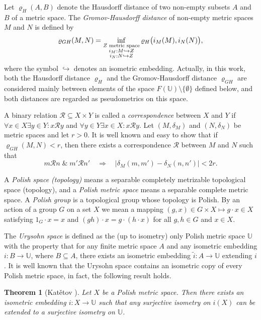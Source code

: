 \documentclass[a4paper]{amsart}
\theoremstyle{plain}
\newtheorem{theorem}{Theorem}[section]
\theoremstyle{remark}
\begin{document}
Let $ \varrho_{H}(A, B) $ denote the Hausdorff distance of two non-empty subsets $ A $ and $ B $ of a metric space. The \emph{Gromov-Hausdorff distance} of non-empty metric spaces $ M $ and $ N $ is defined by
$$ \varrho_{GH} (M, N) = \inf_{\substack{\textnormal{$ Z $ metric space}\\ i_{M} : M \hookrightarrow Z\\ i_{N}: N \hookrightarrow Z}} \varrho_{H} \big( i_{M}(M), i_{N}(N) \big), $$
where the symbol $ \hookrightarrow $ denotes an isometric embedding. Actually, in this work, both the Hausdorff distance $ \varrho_{H} $ and the Gromov-Hausdorff distance $ \varrho_{GH} $ are considered mainly between elements of the space $ F(\mathbb{U}) \setminus \{ \emptyset \} $ defined below, and both distances are regarded as pseudometrics on this space.

A binary relation $ \mathcal{R} \subseteq X \times Y $ is called a \emph{correspondence} between $ X $ and $ Y $ if $ \forall x \in X \exists y \in Y : x \mathcal{R} y $ and $ \forall y \in Y \exists x \in X : x \mathcal{R} y $. Let $ (M, \delta_{M}) $ and $ (N, \delta_{N}) $ be metric spaces and let $ r > 0 $. It is well known and easy to show that if $ \varrho_{GH} (M, N) < r $, then there exists a correspondence $ \mathcal{R} $ between $ M $ and $ N $ such that
$$ m \mathcal{R} n \; \& \; m' \mathcal{R} n' \quad \Rightarrow \quad | \delta_{M}(m, m') - \delta_{N}(n, n')| < 2r. $$

A \emph{Polish space (topology)} means a separable completely metrizable topological space (topology), and a \emph{Polish metric space} means a separable complete metric space. A \emph{Polish group} is a topological group whose topology is Polish. By an action of a group $ G $ on a set $ X $ we mean a mapping $ (g, x) \in G \times X \mapsto g \cdot x \in X $ satisfying $ 1_{G} \cdot x = x $ and $ (gh) \cdot x = g \cdot (h \cdot x) $ for all $ g, h \in G $ and $ x \in X $.

The \emph{Urysohn space} is defined as the (up to isometry) only Polish metric space $ \mathbb{U} $ with the property that for any finite metric space $ A $ and any isometric embedding $ i : B \to \mathbb{U} $, where $ B \subseteq A $, there exists an isometric embedding $ \widetilde{i} : A \to \mathbb{U} $ extending $ i $. It is well known that the Urysohn space contains an isometric copy of every Polish metric space, in fact, the following result holds.


\begin{theorem}[Kat\v{e}tov \cite{katetov}] \label{thmkatetov}
Let $ X $ be a Polish metric space. Then there exists an isometric embedding $ i : X \to \mathbb{U} $ such that any surjective isometry on $ i(X) $ can be extended to a surjective isometry on $ \mathbb{U} $.
\end{theorem}
\end{document}
